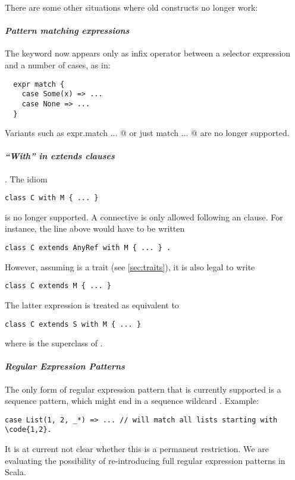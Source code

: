 There are some other situations where old constructs no longer work:

\paragraph{\em Pattern matching expressions} The \lstinline@match@
keyword now appears only as infix operator between a selector
expression and a number of cases, as in:
\begin{lstlisting}
  expr match {
    case Some(x) => ...
    case None => ...
  }
\end{lstlisting}
Variants such as \lstinline@ expr.match {...} @ 
or just
\lstinline@ match {...} @
are no longer supported.

\paragraph{\em ``With'' in extends clauses}. The idiom
\begin{lstlisting}
class C with M { ... }
\end{lstlisting}
is no longer supported. A \lstinline@with@ connective is only allowed
following an \lstinline@extends@ clause. For instance, the line
above would have to be written
\begin{lstlisting}
class C extends AnyRef with M { ... } .
\end{lstlisting}
However, assuming \lstinline@M@ is a trait (see
\ref{sec:traits}), it is also legal to write
\begin{lstlisting}
class C extends M { ... }
\end{lstlisting}
The latter expression is treated as equivalent to
\begin{lstlisting}
class C extends S with M { ... }
\end{lstlisting}
where \lstinline@S@ is the superclass of \lstinline@M@.

\paragraph{\em Regular Expression Patterns} The only form of regular
expression pattern that is currently supported is a sequence pattern,
which might end in a sequence wildcard \code{_*}. Example:
\begin{lstlisting}
case List(1, 2, _*) => ... // will match all lists starting with \code{1,2}.
\end{lstlisting}
It is at current not clear whether this is a permanent restriction. We
are evaluating the possibility of re-introducing full regular
expression patterns in Scala.

